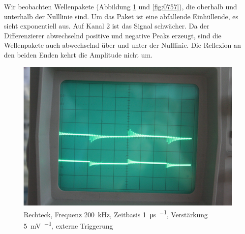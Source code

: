 Wir beobachten Wellenpakete (Abbildung \ref{fig:0756} und \ref{fig:0757}), die
oberhalb und unterhalb der Nulllinie sind. Um das Paket ist eine abfallende
Einhüllende, es sieht exponentiell aus. Auf Kanal 2 ist das Signal schwächer.
Da der Differenzierer abwechselnd positive und negative Peaks erzeugt, sind die
Wellenpakete auch abwechselnd über und unter der Nulllinie. Die Reflexion an
den beiden Enden kehrt die Amplitude nicht um.

\begin{figure}
	\centering
	\begin{minipage}{.45\linewidth}
	\end{minipage}
	\hfill
	\begin{minipage}{.45\linewidth}
	\includegraphics[width=\linewidth]{Fotos/IMG_0756-1500.jpg}
	\end{minipage}
	\caption{%
		Rechteck, Frequenz \SI{200}{\kilo\hertz}, Zeitbasis \SI{1}{\micro\second\per\division}, Verstärkung \SI{5}{\milli\volt\per\division}, externe Triggerung
	}
	\label{fig:0756}
\end{figure}

